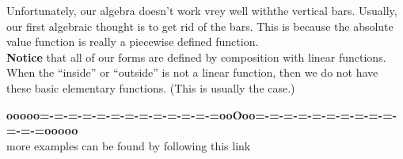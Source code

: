 \documentclass{ximera}
\begin{document}
Unfortunately, our algebra doesn't work vrey well withthe vertical bars.  Usually, our first algebraic thought is to get rid of the bars.  This is because the absolute value function is really a piecewise defined function.   \\



\textbf{Notice} that all of our forms are defined by composition with linear functions.  \\

When the ``inside'' or ``outside'' is not a linear function, then we do not have these basic elementary functions. (This is usually the case.)


























\begin{center}
\textbf{\textcolor{green!50!black}{ooooo=-=-=-=-=-=-=-=-=-=-=-=-=ooOoo=-=-=-=-=-=-=-=-=-=-=-=-=ooooo}} \\

more examples can be found by following this link\\ 

\end{center}
\end{document}

